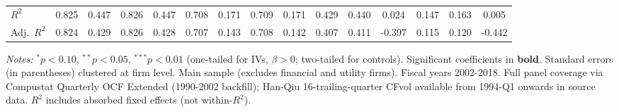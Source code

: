 \documentclass[11pt,a4paper]{article}
\begin{document}
\begin{table}[htbp]
\begin{tabular}{lcccccccccccccc}
$R^2$ & 0.825 & 0.447 & 0.826 & 0.447 & 0.708 & 0.171 & 0.709 & 0.171 & 0.429 & 0.440 & 0.024 & 0.147 & 0.163 & 0.005 \\
Adj.~$R^2$ & 0.824 & 0.429 & 0.826 & 0.428 & 0.707 & 0.143 & 0.708 & 0.142 & 0.407 & 0.411 & -0.397 & 0.115 & 0.120 & -0.442 \\
\bottomrule
\end{tabular}
\begin{minipage}{\linewidth}
\vspace{2pt}\scriptsize
\textit{Notes:} $^{*}p<0.10$, $^{**}p<0.05$, $^{***}p<0.01$ (one-tailed for IVs, $\beta > 0$; two-tailed for controls).
 Significant coefficients in \textbf{bold}.
 Standard errors (in parentheses) clustered at firm level.
 Main sample (excludes financial and utility firms). Fiscal years 2002-2018. Full panel coverage via Compustat Quarterly OCF Extended (1990-2002 backfill); Han-Qiu 16-trailing-quarter CFvol available from 1994-Q1 onwards in source data.
 $R^2$ includes absorbed fixed effects (not within-$R^2$).
\end{minipage}
\end{table}
\clearpage
\end{document}
